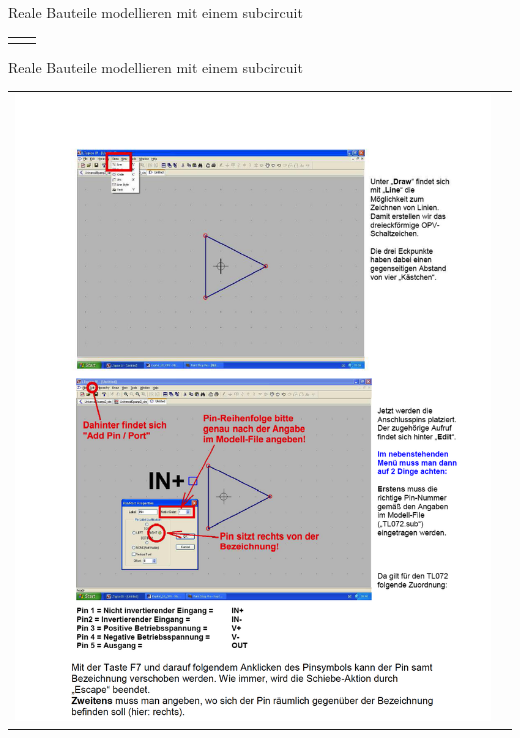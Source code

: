 \begin{frame}[t]{Reale Bauteile modellieren mit einem subcircuit}
\begin{spacing}{0.9}
\begin{tiny}
\begin{table}[h!]
\begin{tabular}{p{5cm} p{5cm}}
\begin{minipage}{0.5\textwidth}
                    \end{minipage}
                \end{tabular}
            \end{table}
        \end{tiny} \end{spacing}
\end{frame}

\begin{frame}[t]{Reale Bauteile modellieren mit einem subcircuit}

    \begin{spacing}{0.9} \begin{tiny}
            \begin{table}[h!]
                \begin{tabular}{p{5cm} p{5cm}}
                    \begin{minipage}{0.5\textwidth}
                        \includegraphics[width=\linewidth]{pictures/legacy/tl072_3.png}
                    \end{minipage}

\end{tabular}
\end{table}
\end{tiny}
\end{spacing}
\end{frame}
